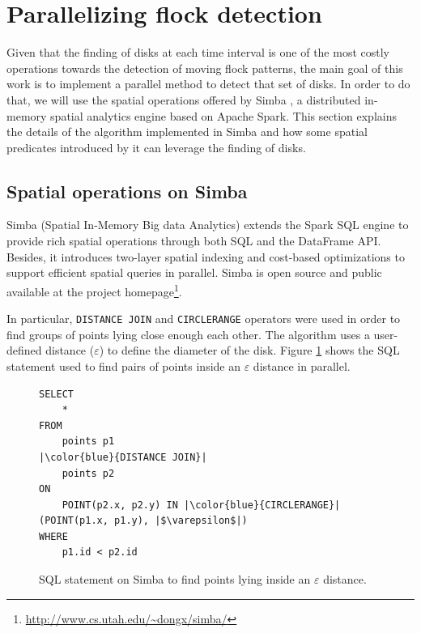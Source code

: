 \documentclass[12pt]{scrartcl}
\begin{document}
\section{Parallelizing flock detection}\label{sec:flock}
% 

Given that the finding of disks at each time interval is one of the most costly operations towards the detection of moving flock patterns, the main goal of this work is to implement a parallel method to detect that set of disks.  In order to do that, we will use the spatial operations offered by Simba \citep{xie_simba:_2016}, a distributed in-memory spatial analytics engine based on Apache Spark. This section explains the details of the algorithm implemented in Simba and how some spatial predicates introduced by it can leverage the finding of disks.

\subsection{Spatial operations on Simba}
Simba (Spatial In-Memory Big data Analytics) extends the Spark SQL engine to provide rich spatial operations through both SQL and the DataFrame API.  Besides, it introduces two-layer spatial indexing and cost-based optimizations to support efficient spatial queries in parallel.  Simba is open source and public available at the project homepage\footnote{\url{http://www.cs.utah.edu/~dongx/simba/}}.

In particular, \texttt{DISTANCE JOIN} and \texttt{CIRCLERANGE} operators were used in order to find groups of points lying close enough each other.  The algorithm uses a user-defined distance ($\varepsilon$) to define the diameter of the disk.  Figure \ref{fig:sql} shows the SQL statement used to find pairs of points inside an $\varepsilon$ distance in parallel.

\begin{figure}
 \centering
    \begin{verbatim}
SELECT 
	* 
FROM 
	points p1
|\color{blue}{DISTANCE JOIN}|
	points p2 
ON 
	POINT(p2.x, p2.y) IN |\color{blue}{CIRCLERANGE}|(POINT(p1.x, p1.y), |$\varepsilon$|)
WHERE 
	p1.id < p2.id
    \end{verbatim}
 \caption{SQL statement on Simba to find points lying inside an $\varepsilon$ distance.}
 \label{fig:sql}
\end{figure}
\end{document}
